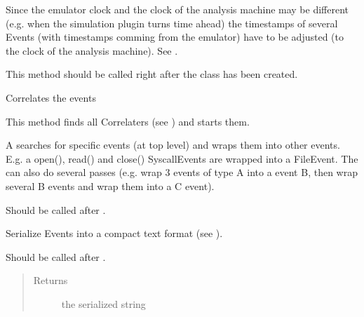 \documentclass[letterpaper,10pt,english]{sphinxmanual}
\begin{document}
\begin{fulllineitems}
\begin{fulllineitems}
Since the emulator clock and the clock of the analysis machine may be different (e.g. when the simulation plugin
turns time ahead) the timestamps of several Events (with timestamps comming from the emulator) have to be
adjusted (to the clock of the analysis machine). See .

This method should be called right after the  class has been created.

\end{fulllineitems}


\begin{fulllineitems}
\label{ambrosia:ambrosia.Ambrosia.correlate}
Correlates the events

This method finds all Correlaters (see ) and starts them.

A {\hyperref[ambrosia:ambrosia.Correlator]{}} searches for specific events (at top level) and wraps them into other events. E.g. a
open(), read() and close() SyscallEvents are wrapped into a FileEvent. The {\hyperref[ambrosia:ambrosia.Correlator]{}} can also do
several passes (e.g. wrap 3 events of type A into a event B, then wrap several B events and wrap them into a C
event).

Should be called after {\hyperref[ambrosia:ambrosia.Ambrosia.adjust_times]{}}.

\end{fulllineitems}


\begin{fulllineitems}
\label{ambrosia:ambrosia.Ambrosia.serialize}
Serialize Events into a compact text format (see ).

Should be called after {\hyperref[ambrosia:ambrosia.Ambrosia.correlate]{}}.
\begin{quote}\begin{description}
\item[{Returns}] \leavevmode
the serialized string

\end{description}\end{quote}

\end{fulllineitems}


\end{fulllineitems}
\end{document}
